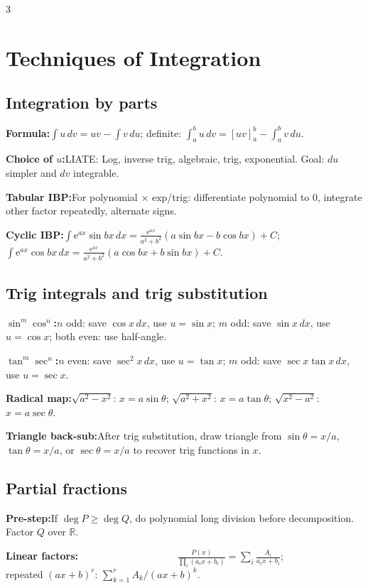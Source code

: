 \documentclass[10pt]{article}
\newcommand{\R}{\mathbb{R}}
\newcommand{\e}{\mathrm e}
\newcommand{\dx}{\,dx}
\newcommand{\du}{\,du}
\newcommand{\dv}{\,dv}
\newenvironment{cheatitems}{\par\vspace{-2pt}}{\par\vspace{-2pt}}
\newcommand{\cheatrow}[2]{%
  \par\noindent\textbf{#1:}\nobreak\hspace{0.25em}#2\par
}
\begin{document}
\begin{multicols}{3}
\begin{cheatitems}
\end{cheatitems}

\section*{Techniques of Integration}

\subsection*{Integration by parts}
\begin{cheatitems}
\cheatrow{Formula}{$\displaystyle\int u\dv=uv-\int v\du$; definite: $\int_a^b u\dv=[uv]_a^b-\int_a^b v\du$.}
\cheatrow{Choice of $u$}{LIATE: Log, inverse trig, algebraic, trig, exponential. Goal: $du$ simpler and $dv$ integrable.}
\cheatrow{Tabular IBP}{For polynomial $\times$ exp/trig: differentiate polynomial to $0$, integrate other factor repeatedly, alternate signs.}
\cheatrow{Cyclic IBP}{$\int\e^{ax}\sin bx\dx=\frac{\e^{ax}}{a^2+b^2}(a\sin bx-b\cos bx)+C$; $\int\e^{ax}\cos bx\dx=\frac{\e^{ax}}{a^2+b^2}(a\cos bx+b\sin bx)+C$.}
\end{cheatitems}

\subsection*{Trig integrals and trig substitution}
\begin{cheatitems}
\cheatrow{$\sin^m\cos^n$}{$n$ odd: save $\cos x\dx$, use $u=\sin x$; $m$ odd: save $\sin x\dx$, use $u=\cos x$; both even: use half-angle.}
\cheatrow{$\tan^m\sec^n$}{$n$ even: save $\sec^2x\dx$, use $u=\tan x$; $m$ odd: save $\sec x\tan x\dx$, use $u=\sec x$.}
\cheatrow{Radical map}{$\sqrt{a^2-x^2}$: $x=a\sin\theta$; $\sqrt{a^2+x^2}$: $x=a\tan\theta$; $\sqrt{x^2-a^2}$: $x=a\sec\theta$.}
\cheatrow{Triangle back-sub}{After trig substitution, draw triangle from $\sin\theta=x/a$, $\tan\theta=x/a$, or $\sec\theta=x/a$ to recover trig functions in $x$.}
\end{cheatitems}

\subsection*{Partial fractions}
\begin{cheatitems}
\cheatrow{Pre-step}{If $\deg P\ge\deg Q$, do polynomial long division before decomposition. Factor $Q$ over $\R$.}
\vspace{-5pt}
\cheatrow{Linear factors}{$\displaystyle \qquad  \qquad \qquad  \qquad \qquad \frac{P(x)}{\prod_i(a_ix+b_i)}=\sum_i\frac{A_i}{a_ix+b_i}$; \\
\vspace{-8pt}
repeated $(ax+b)^r$: $\sum_{k=1}^r A_k/(ax+b)^k$.}


\end{cheatitems}
\end{multicols}
\end{document}
